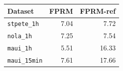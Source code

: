 \begin{tabular}{lrr}
\toprule
Dataset & FPRM & FPRM-ref \\
\midrule
\texttt{stpete\_1h} & 7.04 & 7.72 \\
\texttt{nola\_1h} & 7.25 & 7.54 \\
\texttt{maui\_1h} & 5.51 & 16.33 \\
\texttt{maui\_15min} & 7.61 & 17.66 \\
\bottomrule
\end{tabular}
